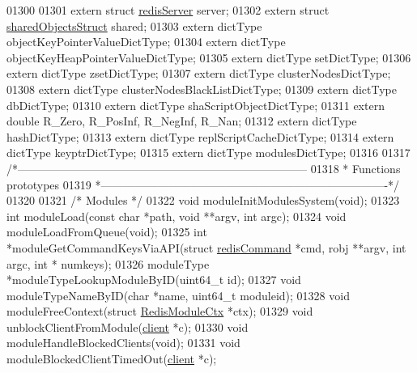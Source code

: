 \begin{DoxyCode}
{{{{{{{01300 
01301 \textcolor{keyword}{extern} \textcolor{keyword}{struct} \hyperlink{structredisServer}{redisServer} server;
01302 \textcolor{keyword}{extern} \textcolor{keyword}{struct} \hyperlink{structsharedObjectsStruct}{sharedObjectsStruct} shared;
01303 \textcolor{keyword}{extern} dictType objectKeyPointerValueDictType;
01304 \textcolor{keyword}{extern} dictType objectKeyHeapPointerValueDictType;
01305 \textcolor{keyword}{extern} dictType setDictType;
01306 \textcolor{keyword}{extern} dictType zsetDictType;
01307 \textcolor{keyword}{extern} dictType clusterNodesDictType;
01308 \textcolor{keyword}{extern} dictType clusterNodesBlackListDictType;
01309 \textcolor{keyword}{extern} dictType dbDictType;
01310 \textcolor{keyword}{extern} dictType shaScriptObjectDictType;
01311 \textcolor{keyword}{extern} \textcolor{keywordtype}{double} R\_Zero, R\_PosInf, R\_NegInf, R\_Nan;
01312 \textcolor{keyword}{extern} dictType hashDictType;
01313 \textcolor{keyword}{extern} dictType replScriptCacheDictType;
01314 \textcolor{keyword}{extern} dictType keyptrDictType;
01315 \textcolor{keyword}{extern} dictType modulesDictType;
01316 
01317 \textcolor{comment}{/*-----------------------------------------------------------------------------}
01318 \textcolor{comment}{ * Functions prototypes}
01319 \textcolor{comment}{ *----------------------------------------------------------------------------*/}
01320 
01321 \textcolor{comment}{/* Modules */}
01322 \textcolor{keywordtype}{void} moduleInitModulesSystem(\textcolor{keywordtype}{void});
01323 \textcolor{keywordtype}{int} moduleLoad(\textcolor{keyword}{const} \textcolor{keywordtype}{char} *path, \textcolor{keywordtype}{void} **argv, \textcolor{keywordtype}{int} argc);
01324 \textcolor{keywordtype}{void} moduleLoadFromQueue(\textcolor{keywordtype}{void});
01325 \textcolor{keywordtype}{int} *moduleGetCommandKeysViaAPI(\textcolor{keyword}{struct} \hyperlink{structredisCommand}{redisCommand} *cmd, robj **argv, \textcolor{keywordtype}{int} argc, \textcolor{keywordtype}{int} *
      numkeys);
01326 moduleType *moduleTypeLookupModuleByID(uint64\_t id);
01327 \textcolor{keywordtype}{void} moduleTypeNameByID(\textcolor{keywordtype}{char} *name, uint64\_t moduleid);
01328 \textcolor{keywordtype}{void} moduleFreeContext(\textcolor{keyword}{struct} \hyperlink{structRedisModuleCtx}{RedisModuleCtx} *ctx);
01329 \textcolor{keywordtype}{void} unblockClientFromModule(\hyperlink{structclient}{client} *c);
01330 \textcolor{keywordtype}{void} moduleHandleBlockedClients(\textcolor{keywordtype}{void});
01331 \textcolor{keywordtype}{void} moduleBlockedClientTimedOut(\hyperlink{structclient}{client} *c);
}}}}}}}
\end{DoxyCode}
